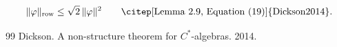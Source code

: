 \documentclass{article}
\begin{document}
\begin{equation}
 \|\varphi\|_{\mathrm{row}}
       \le\sqrt2\,\|\varphi\|^2
 \qquad\text{\citep[Lemma~2.9, Equation~(19)]{Dickson2014}}.
 \label{eq:dickson-row}
\end{equation}
\begin{thebibliography}{99}
 Dickson. A non-structure theorem for $C^*$-algebras. 2014.
\end{thebibliography}
\end{document}
